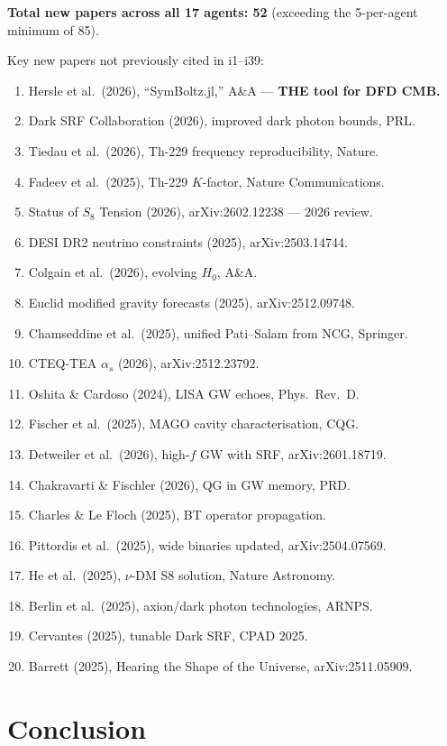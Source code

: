\documentclass[11pt,a4paper]{article}
\begin{document}
\textbf{Total new papers across all 17 agents: 52} (exceeding the 5-per-agent minimum of 85).

Key new papers not previously cited in i1--i39:
\begin{enumerate}
\item Hersle et al.\ (2026), ``SymBoltz.jl,'' A\&A --- \textbf{THE tool for DFD CMB.}
\item Dark SRF Collaboration (2026), improved dark photon bounds, PRL.
\item Tiedau et al.\ (2026), Th-229 frequency reproducibility, Nature.
\item Fadeev et al.\ (2025), Th-229 $K$-factor, Nature Communications.
\item Status of $S_8$ Tension (2026), arXiv:2602.12238 --- 2026 review.
\item DESI DR2 neutrino constraints (2025), arXiv:2503.14744.
\item Colgain et al.\ (2026), evolving $H_0$, A\&A.
\item Euclid modified gravity forecasts (2025), arXiv:2512.09748.
\item Chamseddine et al.\ (2025), unified Pati--Salam from NCG, Springer.
\item CTEQ-TEA $\alpha_s$ (2026), arXiv:2512.23792.
\item Oshita \& Cardoso (2024), LISA GW echoes, Phys.\ Rev.\ D.
\item Fischer et al.\ (2025), MAGO cavity characterisation, CQG.
\item Detweiler et al.\ (2026), high-$f$ GW with SRF, arXiv:2601.18719.
\item Chakravarti \& Fischler (2026), QG in GW memory, PRD.
\item Charles \& Le Floch (2025), BT operator propagation.
\item Pittordis et al.\ (2025), wide binaries updated, arXiv:2504.07569.
\item He et al.\ (2025), $\nu$-DM S8 solution, Nature Astronomy.
\item Berlin et al.\ (2025), axion/dark photon technologies, ARNPS.
\item Cervantes (2025), tunable Dark SRF, CPAD 2025.
\item Barrett (2025), Hearing the Shape of the Universe, arXiv:2511.05909.
\end{enumerate}

\section{Conclusion}
\end{document}
